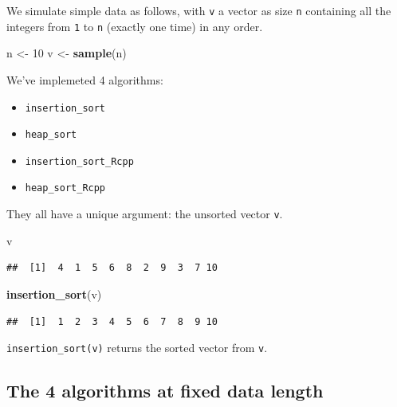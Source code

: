 \documentclass[
]{article}
\newenvironment{Shaded}{\begin{snugshade}}{\end{snugshade}}
\newcommand{\DecValTok}[1]{\textcolor[rgb]{0.00,0.00,0.81}{#1}}
\newcommand{\FunctionTok}[1]{\textcolor[rgb]{0.13,0.29,0.53}{\textbf{#1}}}
\newcommand{\NormalTok}[1]{#1}
\newcommand{\OtherTok}[1]{\textcolor[rgb]{0.56,0.35,0.01}{#1}}
\providecommand{\tightlist}{%
  \setlength{\itemsep}{0pt}\setlength{\parskip}{0pt}}
\begin{document}
We simulate simple data as follows, with \texttt{v} a vector as size
\texttt{n} containing all the integers from \texttt{1} to \texttt{n}
(exactly one time) in any order.

\begin{Shaded}
\begin{Highlighting}[]
\NormalTok{n }\OtherTok{\textless{}{-}} \DecValTok{10}
\NormalTok{v }\OtherTok{\textless{}{-}} \FunctionTok{sample}\NormalTok{(n)}
\end{Highlighting}
\end{Shaded}

We've implemeted 4 algorithms:

\begin{itemize}
\tightlist
\item
  \texttt{insertion\_sort}
\item
  \texttt{heap\_sort}
\item
  \texttt{insertion\_sort\_Rcpp}
\item
  \texttt{heap\_sort\_Rcpp}
\end{itemize}

They all have a unique argument: the unsorted vector \texttt{v}.

\begin{Shaded}
\begin{Highlighting}[]
\NormalTok{v}
\end{Highlighting}
\end{Shaded}

\begin{verbatim}
##  [1]  4  1  5  6  8  2  9  3  7 10
\end{verbatim}

\begin{Shaded}
\begin{Highlighting}[]
\FunctionTok{insertion\_sort}\NormalTok{(v)}
\end{Highlighting}
\end{Shaded}

\begin{verbatim}
##  [1]  1  2  3  4  5  6  7  8  9 10
\end{verbatim}

\texttt{insertion\_sort(v)} returns the sorted vector from \texttt{v}.

\subsection{The 4 algorithms at fixed data
length}\label{the-4-algorithms-at-fixed-data-length}
\end{document}
